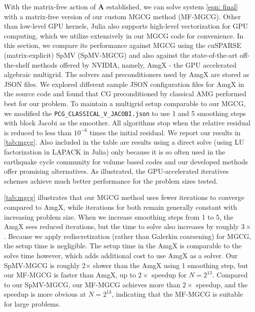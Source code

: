 With the matrix-free action of $\boldsymbol{A}$ established, we can solve system \autoref{eqn: final} with a matrix-free version of our custom MGCG method (MF-MGCG). 
Other than low-level GPU kernels, Julia also supports high-level vectorization for GPU computing, which we utilize extensively in our MGCG code for convenience.
In this section, we compare its performance against MGCG using the cuSPARSE (matrix-explicit) SpMV (SpMV-MGCG) and also against the state-of-the-art off-the-shelf methods offered by NVIDIA, namely, AmgX - the GPU accelerated algebraic multigrid. The solvers and preconditioners used by AmgX are stored as JSON files. 
We explored different sample JSON configuration files for AmgX in the source code and found that CG preconditioned by classical AMG performed best for our problem. 
To maintain a multigrid setup comparable to our MGCG, we modified the \texttt{PCG\_CLASSICAL\_V\_JACOBI.json} to use 1 and 5 smoothing steps with block Jacobi as the smoother.
All algorithms stop when the relative residual is reduced to less than $10^{-6}$ times the initial residual.
We report our results in \autoref{tab:mgcg}. Also included in the table are results using a direct solve (using LU factorization in LAPACK in Julia) only because it is so often used in the earthquake cycle community for volume based codes \cite{erickson2020community} and our developed methods offer promising alternatives. As illustrated, the GPU-accelerated iteratives schemes achieve much better performance for the problem sizes tested.

\autoref{tab:mgcg} illustrates that our MGCG method uses fewer iterations to converge compared to AmgX, while iterations for both remain generally constant with increasing problem size. When we increase smoothing steps from 1 to 5, the AmgX sees reduced iterations, but the time to solve also increases by roughly $3\times$.
Because we apply rediscretization (rather than Galerkin coarsening) for MGCG, the setup time is negligible.
The setup time in the AmgX is comparable to the solve time however, which adds additional cost to use AmgX as a solver.
Our SpMV-MGCG is roughly 2$\times$ slower than the AmgX using 1 smoothing step, but our MF-MGCG is faster than AmgX, up to $2\times$ speedup for $N = 2^{13}$.
Compared to our SpMV-MGCG, our MF-MGCG achieves more than $2\times$ speedup, and the speedup is more obvious at $N=2^{13}$, indicating that the MF-MGCG is suitable for large problems.


